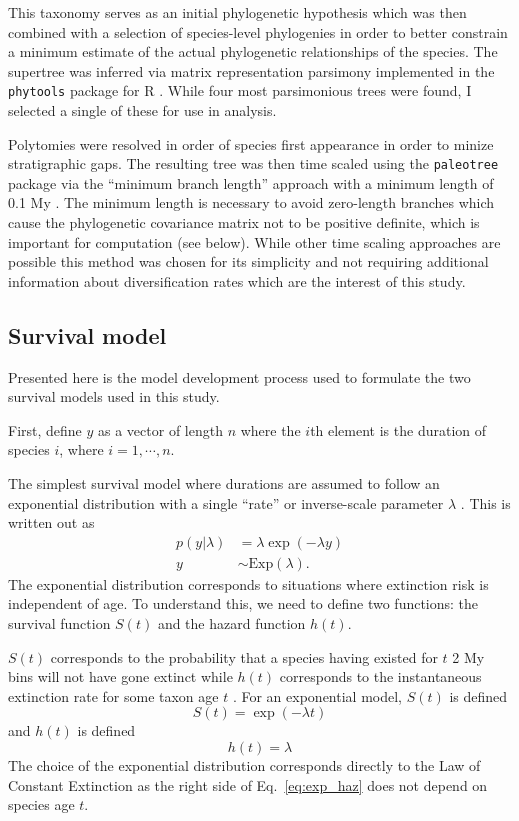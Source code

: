 \documentclass{article}
\begin{document}
This taxonomy serves as an initial phylogenetic hypothesis which was then combined with a selection of species-level phylogenies \cite{Bininda-Emonds2007,Raia2012f} in order to better constrain a minimum estimate of the actual phylogenetic relationships of the species. The supertree was inferred via matrix representation parsimony implemented in the \texttt{phytools} package for R \cite{revell2012phytools}. While four most parsimonious trees were found, I selected a single of these for use in analysis.

Polytomies were resolved in order of species first appearance in order to minize stratigraphic gaps. The resulting tree was then time scaled using the \texttt{paleotree} package via the ``minimum branch length'' approach with a minimum length of 0.1 My \cite{Bapst2012a}. The minimum length is necessary to avoid zero-length branches which cause the phylogenetic covariance matrix not to be positive definite, which is important for computation (see below). While other time scaling approaches are possible \cite{Bapst2013a,Hedman2010} this method was chosen for its simplicity and not requiring additional information about diversification rates which are the interest of this study. 


\subsection{Survival model}
Presented here is the model development process used to formulate the two survival models used in this study. 

First, define \(y\) as a vector of length \(n\) where the \(i\)th element is the duration of species \(i\), where \(i = 1,\cdots,n\).

The simplest survival model where durations are assumed to follow an exponential distribution with a single ``rate'' or inverse-scale parameter \(\lambda\) \cite{Klein2003}. This is written out as
\begin{align}
  p(y | \lambda) &= \lambda \exp(-\lambda y) \nonumber \\
  y &\sim \mathrm{Exp}(\lambda).
  \label{eq:exp}
\end{align}
The exponential distribution corresponds to situations where extinction risk is independent of age. To understand this, we need to define two functions: the survival function \(S(t)\) and the hazard function \(h(t)\). 

\(S(t)\) corresponds to the probability that a species having existed for \(t\) 2 My bins will not have gone extinct while \(h(t)\) corresponds to the instantaneous extinction rate for some taxon age \(t\) \cite{Klein2003}. For an exponential model, \(S(t)\) is defined
\begin{equation}
  S(t) = \exp(-\lambda t)
  \label{eq:exp_surv}
\end{equation}
and \(h(t)\) is defined
\begin{equation}
  h(t) = \lambda
  \label{eq:exp_haz}
\end{equation}
The choice of the exponential distribution corresponds directly to the Law of Constant Extinction \cite{VanValen1973} as the right side of Eq.~\ref{eq:exp_haz} does not depend on species age \(t\). 
\end{document}
